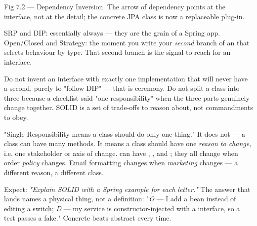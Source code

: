 \begin{wbfigure}{Fig 7.2 — Dependency Inversion. The arrow of dependency points at the interface, not at the detail; the concrete JPA class is now a replaceable plug-in.}
\end{wbfigure}

 SRP and DIP: essentially always --- they are the grain of a Spring app. Open/Closed and Strategy: the moment you write your \emph{second} branch of an  that selects behaviour by type. That second branch is the signal to reach for an interface.

 Do not invent an interface with exactly one implementation that will never have a second, purely to "follow DIP" --- that is ceremony. Do not split a class into three because a checklist said "one responsibility" when the three parts genuinely change together. SOLID is a set of trade-offs to reason about, not commandments to obey.

\begin{misconception}
"Single Responsibility means a class should do only one thing." It does not --- a class can have many methods. It means a class should have one \emph{reason to change}, i.e. one stakeholder or axis of change.  can have , , and ; they all change when order \emph{policy} changes. Email formatting changes when \emph{marketing} changes --- a different reason, a different class.
\end{misconception}

\begin{interview}
Expect: \emph{"Explain SOLID with a Spring example for each letter."} The answer that lands names a physical thing, not a definition: "\emph{O} --- I add a  bean instead of editing a switch; \emph{D} --- my service is constructor-injected with a  interface, so a test passes a fake." Concrete beats abstract every time.
\end{interview}

